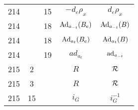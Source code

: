 \documentclass[a4paper,11pt]{article}
\begin{document}
\begin{center}
\begin{tabular}{|c|c|c|c|c|}
    214 & & 15 & $-d_{ e }\rho_{ x }$ & $d_{ e }\rho_{ x }$ \\
    214 & & 18 & $\mathrm{Ad}_{ a_{ -t } }( B_{ e } )$
           & $\mathrm{Ad}_{ a_{ -t } }( B )$ \\
    214 & & 18 & $\mathrm{Ad}_{ a_{ t } }( B_{ e } )$ & $\mathrm{Ad}_{ a_{ t } }( B )$ \\
    214 & & 19 & $ad_{ a_{ t } }$ & $\mathrm{ad}_{ a_{ -t } }$ \\
    215 & \hphantom{0}2 & & $R$ & $\mathcal{R}$ \\
    215 & \hphantom{0}3 & & $R$ & $\mathcal{R}$ \\
    215 & 15 & & $i_{ G }$ & $i_{ G }^{ -1 }$ \\
    \hline
  \end{tabular}





  \newpage


\end{center}
\end{document}
